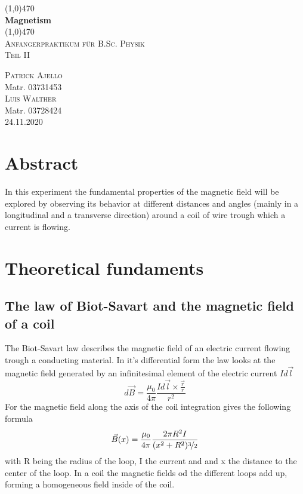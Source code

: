 \documentclass[12pt]{article}
\begin{document}
	\begin{titlepage}
		\begin{center}
		\line(1,0){470}\\
		\vspace{6mm}
		\huge{\bfseries Magnetism}\\
		\vspace{3mm}
		\line(1,0){470}\\
		\textsc{\LARGE Anfängerpraktikum für B.Sc. Physik}\\	
		\textsc{\large Teil II}
		\vspace{10cm}
		\end{center}
		\begin{center}
			\textsc{\large Patrick Ajello}\\
			Matr. 03731453\\
			\textsc{\large Luis Walther}\\
			Matr. 03728424\\
			\vspace{2mm}
			24.11.2020
		\end{center}
	\end{titlepage}
	
	\tableofcontents
	\thispagestyle{empty}
	\cleardoublepage
	
	\setcounter{page}{1}
	\section{Abstract}\label{sec:abs} 
		In this experiment the fundamental properties of the magnetic field will be explored by observing its behavior at different distances and angles (mainly in a longitudinal and a transverse direction) around a coil of wire trough which a current is flowing.
		
	\section{Theoretical fundaments}\label{sec:gru}
		\subsection{The law of Biot-Savart and the magnetic field of a coil}
			The Biot-Savart law describes the magnetic field of an electric current flowing trough a conducting material. In it's differential form the law looks at the magnetic field generated by an infinitesimal element of the electric current $Id\vec{l}$
			\begin{equation}\label{eq:biot diff}
				d\vec{B} = \frac{\mu_0}{4\pi}\frac{Id\vec{l}\times \frac{\vec{r}}{r}}{r^2}
			\end{equation}
			For the magnetic field along the axis of the coil integration gives the following formula
			\begin{equation}\label{eq:biot}
				\vec{B}(x) = \frac{\mu_0}{4\pi}\frac{2\pi R^2 I}{(x^2+R^2)\nicefrac{3}{2}}
			\end{equation}
			with R being the radius of the loop, I the current and and x the distance to the center of the loop. In a coil the magnetic fields od the different loops add up, forming a homogeneous field inside of the coil. 
			
\end{document}
